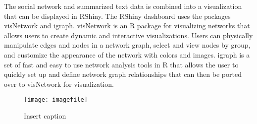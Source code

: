 The social network and summarized text data is combined into a visualization that can be displayed in RShiny. The RShiny dashboard uses the packages visNetwork and igraph. visNetwork is an R package for visualizing networks that allows users to create dynamic and interactive visualizations. Users can physically manipulate edges and nodes in a network graph, select and view nodes by group, and customize the appearance of the network with colors and images. igraph is a set of fast and easy to use network analysis tools in R that allows the user to quickly set up and define network graph relationships that can then be ported over to visNetwork for visualization.

\begin{figure}
	\texttt{[image: imagefile]}
	\caption{Insert caption}
	\label{Insert label}
\end{figure}


